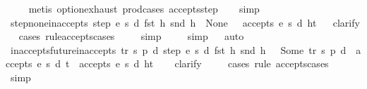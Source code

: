 \begin{isabellebody}
\ \ \ \isamarkupfalse%
\ {\isacharparenleft}metis\ option{\isachardot}exhaust\ prod{\isacharunderscore}cases{}\ accepts{\isachardot}step{\isacharparenright}\isanewline
\ \ \isamarkupfalse%
\ simp%
\endisatagproof
{\isafoldproof}%
%
\isadelimproof
\isanewline
%
\endisadelimproof
\isanewline
{}\isamarkupfalse%
\ step{\isacharunderscore}none{\isacharunderscore}inaccepts{\isacharcolon}\ {\isachardoublequoteopen}{\isacharparenleft}{\isacharparenleft}step\ e\ s\ d\ {\isacharparenleft}fst\ h{\isacharparenright}\ {\isacharparenleft}snd\ h{\isacharparenright}{\isacharparenright}\ {\isacharequal}\ None{\isacharparenright}\ {\isasymLongrightarrow}\ {\isasymnot}\ {\isacharparenleft}accepts\ e\ s\ d\ {\isacharparenleft}h{\isacharhash}t{\isacharparenright}{\isacharparenright}{\isachardoublequoteclose}\isanewline
%
\isadelimproof
\ \ %
\endisadelimproof
%
\isatagproof
{}\isamarkupfalse%
{\isacharparenleft}clarify{\isacharparenright}\isanewline
\ \ \isamarkupfalse%
{\isacharparenleft}cases\ rule{\isacharcolon}accepts{\isachardot}cases{\isacharparenright}\isanewline
\ \ \ \ \isamarkupfalse%
{\isacharparenleft}simp{\isacharparenright}\isanewline
\ \ \ \isamarkupfalse%
\ simp\isanewline
\ \ \isamarkupfalse%
{\isacharparenleft}auto{\isacharparenright}%
\endisatagproof
{\isafoldproof}%
%
\isadelimproof
\isanewline
%
\endisadelimproof
\isanewline
{}\isamarkupfalse%
\ inaccepts{\isacharunderscore}future{\isacharunderscore}inaccepts{\isacharcolon}\ {\isachardoublequoteopen}{\isacharparenleft}{\isasymexists}tr\ s{\isacharprime}\ p{\isacharprime}\ d{\isacharprime}{\isachardot}\ step\ e\ s\ d\ {\isacharparenleft}fst\ h{\isacharparenright}\ {\isacharparenleft}snd\ h{\isacharparenright}\ {\isacharequal}\ \ Some\ {\isacharparenleft}tr{\isacharcomma}\ s{\isacharprime}{\isacharcomma}\ p{\isacharprime}{\isacharcomma}\ d{\isacharprime}{\isacharparenright}\ {\isasymand}\ {\isasymnot}accepts\ e\ s{\isacharprime}\ d{\isacharprime}\ t{\isacharparenright}\ {\isasymLongrightarrow}\ {\isasymnot}accepts\ e\ s\ d\ {\isacharparenleft}h{\isacharhash}t{\isacharparenright}{\isachardoublequoteclose}\isanewline
%
\isadelimproof
\ \ %
\endisadelimproof
%
\isatagproof
{}\isamarkupfalse%
\ clarify\isanewline
\ \ \ \ \isamarkupfalse%
{\isacharparenleft}cases\ rule{\isacharcolon}\ accepts{\isachardot}cases{\isacharparenright}\isanewline
\ \ \ \ \isamarkupfalse%
\ simp\isanewline
\ \ \ \isamarkupfalse%

\end{isabellebody}
